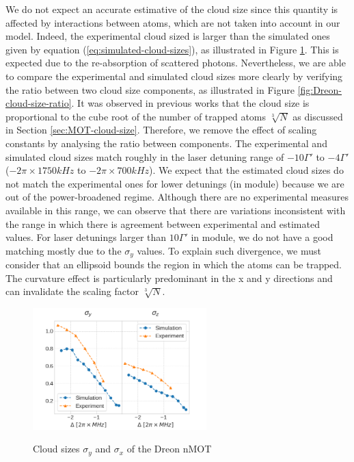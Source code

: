 We do not expect an accurate estimative of the cloud size since this quantity is affected by interactions between atoms, which are not taken into account in our model. Indeed, the experimental cloud sized is larger than the simulated ones given by equation (\ref{eq:simulated-cloud-sizes}), as illustrated in Figure \ref{fig:Dreon-cloud-size}. This is expected due to the re-absorption of scattered photons. Nevertheless, we are able to compare the experimental and simulated cloud sizes more clearly by verifying the ratio between two cloud size components, as illustrated in Figure \ref{fig:Dreon-cloud-size-ratio}. It was observed in previous works \cite{PhysRevA.90.063404} that the cloud size is proportional to the cube root of the number of trapped atoms $ \sqrt[3]{N} $ as discussed in Section \ref{sec:MOT-cloud-size}. Therefore, we remove the effect of scaling constants by analysing the ratio between components. The experimental and simulated cloud sizes match roughly in the laser detuning range of $ -10\Gamma' $ to $ -4\Gamma' $ ($ -2\pi \times 1750 kHz $ to $ -2\pi \times 700 kHz $). We expect that the estimated cloud sizes do not match the experimental ones for lower detunings (in module) because we are out of the power-broadened regime. Although there are no experimental measures available in this range, we can observe that there are variations inconsistent with the range in which there is agreement between experimental and estimated values. For laser detunings larger than $ 10\Gamma' $ in module, we do not have a good matching mostly due to the $ \sigma_y $ values. To explain such divergence, we must consider that an ellipsoid bounds the region in which the atoms can be trapped. The curvature effect is particularly predominant in the x and y directions and can invalidate the scaling factor $ \sqrt[3]{N} $.

\begin{figure}[!ht]
    \centering
    \caption{Cloud sizes $ \sigma_y $ and $ \sigma_x $ of the Dreon nMOT}
    \includegraphics[width=0.6\textwidth]{USPSC-img/dy_cloud_size.png}
    \vspace{5px}
    \label{fig:Dreon-cloud-size}
\end{figure}

